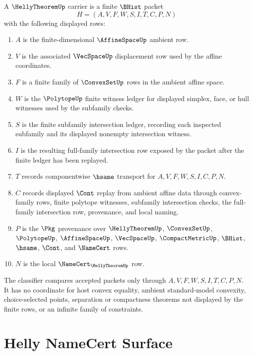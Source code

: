 \begin{definition}\label{def:helly-theorem-carrier}
A $\HellyTheoremUp$ carrier is a finite $\BHist$ packet
$$
H=(A,V,F,W,S,I,T,C,P,N)
$$
with the following displayed rows:
\begin{enumerate}
\item $A$ is the finite-dimensional $\AffineSpaceUp$ ambient row.
\item $V$ is the associated $\VecSpaceUp$ displacement row used by the affine coordinates.
\item $F$ is a finite family of $\ConvexSetUp$ rows in the ambient affine space.
\item $W$ is the $\PolytopeUp$ finite witness ledger for displayed simplex, face, or hull witnesses used by the subfamily checks.
\item $S$ is the finite subfamily intersection ledger, recording each inspected subfamily and its displayed nonempty intersection witness.
\item $I$ is the resulting full-family intersection row exposed by the packet after the finite ledger has been replayed.
\item $T$ records componentwise $\hsame$ transport for $A,V,F,W,S,I,C,P,N$.
\item $C$ records displayed $\Cont$ replay from ambient affine data through convex-family rows, finite polytope witnesses, subfamily intersection checks, the full-family intersection row, provenance, and local naming.
\item $P$ is the $\Pkg$ provenance over $\HellyTheoremUp$, $\ConvexSetUp$, $\PolytopeUp$, $\AffineSpaceUp$, $\VecSpaceUp$, $\CompactMetricUp$, $\BHist$, $\hsame$, $\Cont$, and $\NameCert$ rows.
\item $N$ is the local $\NameCert_{\HellyTheoremUp}$ row.
\end{enumerate}
The classifier compares accepted packets only through $A,V,F,W,S,I,T,C,P,N$. It has no coordinate for host convex equality, ambient standard-model convexity, choice-selected points, separation or compactness theorems not displayed by the finite rows, or an infinite family of constraints.
\end{definition}

\section{Helly NameCert Surface}
\label{sec:helly-theorem-namecert-surface}

